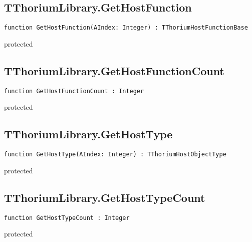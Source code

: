 \subsection{TThoriumLibrary.GetHostFunction}
\label{thoriumcorepkg:thorium:tthoriumlibrary:gethostfunction}
\begin{FPCList}
\Declaration 

\begin{verbatim}
function GetHostFunction(AIndex: Integer) : TThoriumHostFunctionBase
\end{verbatim}
\Visibility
protected
\end{FPCList}
\subsection{TThoriumLibrary.GetHostFunctionCount}
\label{thoriumcorepkg:thorium:tthoriumlibrary:gethostfunctioncount}
\begin{FPCList}
\Declaration 

\begin{verbatim}
function GetHostFunctionCount : Integer
\end{verbatim}
\Visibility
protected
\end{FPCList}
\subsection{TThoriumLibrary.GetHostType}
\label{thoriumcorepkg:thorium:tthoriumlibrary:gethosttype}
\begin{FPCList}
\Declaration 

\begin{verbatim}
function GetHostType(AIndex: Integer) : TThoriumHostObjectType
\end{verbatim}
\Visibility
protected
\end{FPCList}
\subsection{TThoriumLibrary.GetHostTypeCount}
\label{thoriumcorepkg:thorium:tthoriumlibrary:gethosttypecount}
\begin{FPCList}
\Declaration 

\begin{verbatim}
function GetHostTypeCount : Integer
\end{verbatim}
\Visibility
protected
\end{FPCList}
